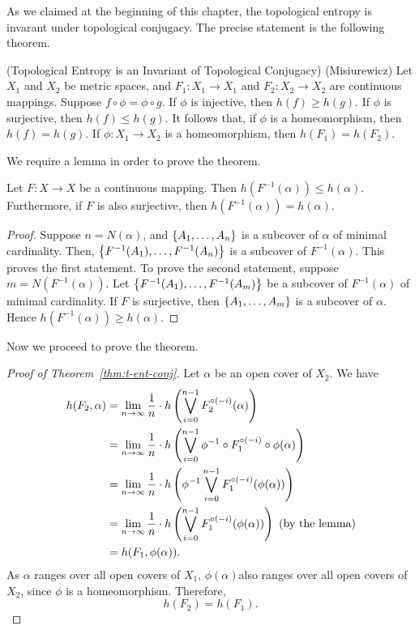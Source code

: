 \documentclass[12pt,twoside,draft]{book}
\begin{document}
As we claimed at the beginning of this chapter, the topological entropy is invarant under topological conjugacy.
The precise statement is the following theorem.
\begin{theorem}
  (Topological Entropy is an Invariant of Topological Conjugacy)
  (Misiurewicz)
  Let $X_1$ and $X_2$ be metric spaces, and $F_1: X_1 \to X_1$ and $F_2: X_2 \to X_2$ are continuous mappings.
  Suppose $f\circ \phi = \phi \circ g$.
  If $\phi$ is injective, then $h(f) \geq h(g)$.
  If $\phi$ is surjective, then $h(f) \leq h(g)$.
  It follows that, if $\phi$ is a homeomorphism, then $h(f) = h(g)$.
  If $\phi: X_1 \to X_2$ is a homeomorphism, then $h(F_1) = h(F_2)$.
  \label{thm:t-ent-conj}
\end{theorem}
We require a lemma in order to prove the theorem.

\begin{lemma}
  Let $F: X\to X$ be a continuous mapping.
  Then $h(F^{-1}(\alpha)) \leq h(\alpha)$.
  Furthermore, if $F$ is also surjective, then $h(F^{-1}(\alpha)) = h(\alpha)$.
  \begin{proof}
    Suppose $n = N(\alpha)$, and $\left \{ A_1, \ldots, A_{n} \right \}$ is a subcover of $\alpha$ of minimal cardinality.
    Then, $\left \{ F^{-1}(A_1), \ldots, F^{-1}(A_{n}) \right \}$ is a subcover of $F^{-1}(\alpha)$.
    This proves the first statement.
    To prove the second statement, suppose $m = N(F^{-1}(\alpha))$.
    Let $\left \{ F^{-1}(A_1), \ldots, F^{-1}(A_{m}) \right \}$ be a subcover of $F^{-1}(\alpha)$ of minimal cardinality.
    If $F$ is surjective, then $\left \{ A_1, \ldots, A_{m} \right \}$ is a subcover of $\alpha$.
    Hence $h(F^{-1}(\alpha)) \geq h(\alpha)$.
  \end{proof}

\end{lemma}

Now we proceed to prove the theorem.
\begin{proof}[Proof of Theorem~\ref{thm:t-ent-conj}]
  Let $\alpha$ be an open cover of $X_2$.
  We have
  \begin{align*}
    h(F_2, \alpha)
    &= \lim\limits_{n \to \infty} \frac{1}{n} \cdot h \left ( \bigvee\limits_{i = 0}^{n-1} F_2^{\circ (-i)}(\alpha) \right ) \\
    &= \lim\limits_{n \to \infty} \frac{1}{n} \cdot h \left ( \bigvee\limits_{i = 0}^{n-1} \phi^{-1} \circ F_1^{\circ (-i)} \circ \phi (\alpha) \right ) \\
    &= \lim\limits_{n \to \infty} \frac{1}{n} \cdot h \left ( \phi^{-1} \bigvee\limits_{i = 0}^{n-1} F_1^{\circ (-i)} (\phi (\alpha)) \right ) \\
    &= \lim\limits_{n \to \infty} \frac{1}{n} \cdot h \left ( \bigvee\limits_{i = 0}^{n-1} F_1^{\circ (-i)} (\phi (\alpha)) \right ) \mbox{ (by the lemma)} \\
    &= h(F_1, \phi(\alpha)).
  \end{align*}
  As $\alpha$ ranges over all open covers of $X_1$, $\phi(\alpha)$also ranges over all open covers of $X_2$, since $\phi$ is a homeomorphism.
  Therefore,
  \begin{equation*}
    h(F_2) = h(F_1).
  \end{equation*}
\end{proof}
\end{document}
